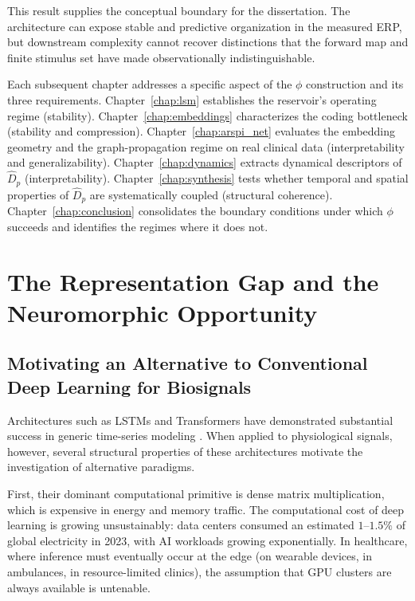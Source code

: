 This result supplies the conceptual boundary for the dissertation. The
architecture can expose stable and predictive organization in the measured ERP,
but downstream complexity cannot recover distinctions that the forward map and
finite stimulus set have made observationally indistinguishable.

Each subsequent chapter addresses a specific aspect of the $\phi$ construction and its three requirements. Chapter~\ref{chap:lsm} establishes the reservoir's operating regime (stability). Chapter~\ref{chap:embeddings} characterizes the coding bottleneck (stability and compression). Chapter~\ref{chap:arspi_net} evaluates the embedding geometry and the graph-propagation regime on real clinical data (interpretability and generalizability). Chapter~\ref{chap:dynamics} extracts dynamical descriptors of $\hat{D}_p$ (interpretability). Chapter~\ref{chap:synthesis} tests whether temporal and spatial properties of $\hat{D}_p$ are systematically coupled (structural coherence). Chapter~\ref{chap:conclusion} consolidates the boundary conditions under which $\phi$ succeeds and identifies the regimes where it does not.


\section{The Representation Gap and the Neuromorphic Opportunity}

\subsection{Motivating an Alternative to Conventional Deep Learning for Biosignals}

Architectures such as LSTMs and Transformers have demonstrated substantial success in generic time-series modeling \cite{ismail_fawaz_deep_2019}. When applied to physiological signals, however, several structural properties of these architectures motivate the investigation of alternative paradigms.

First, their dominant computational primitive is dense matrix multiplication, which is expensive in energy and memory traffic. The computational cost of deep learning is growing unsustainably: data centers consumed an estimated $1$--$1.5\%$ of global electricity in 2023, with AI workloads growing exponentially. In healthcare, where inference must eventually occur at the edge (on wearable devices, in ambulances, in resource-limited clinics), the assumption that GPU clusters are always available is untenable.

